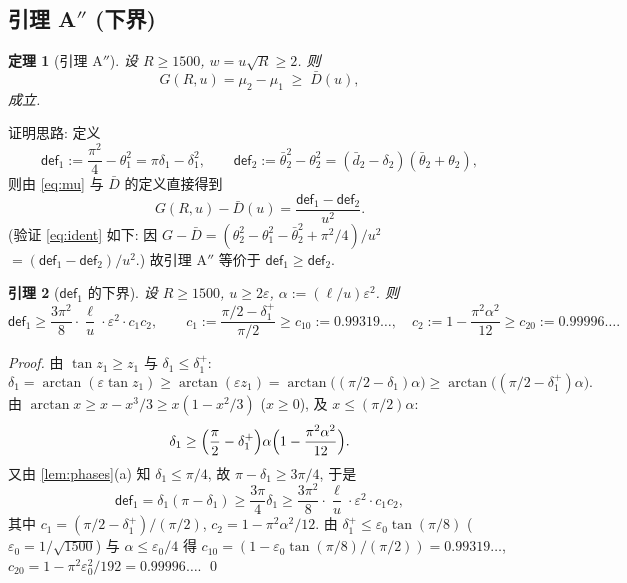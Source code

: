 \documentclass[UTF8]{ctexart}
\newtheorem{theorem}{定理}[section]
\newtheorem{lemma}[theorem]{引理}
\begin{document}
\subsection{引理 A\texorpdfstring{$''$}{} (下界)}\label{sec:lemAdp}
\begin{theorem}[引理 A$''$]\label{thm:lemAdp}
设 $R\ge1500$, $w=u\sqrt R\ge2$. 则
\begin{equation}
	G(R,u)=\mu_2-\mu_1\;\ge\;\bar D(u),
\end{equation}
成立.
\end{theorem}

证明思路: 定义
\begin{equation}
	\mathsf{def}_1:=\frac{\pi^2}{4}-\theta_1^2=\pi\delta_1-\delta_1^2,\qquad
	\mathsf{def}_2:=\bar\theta_2^2-\theta_2^2=(\bar d_2-\delta_2)(\bar\theta_2+\theta_2),
\end{equation}
则由 \eqref{eq:mu} 与 $\bar D$ 的定义直接得到
\begin{equation}
	G(R,u)-\bar D(u)=\frac{\mathsf{def}_1-\mathsf{def}_2}{u^2}.
	\label{eq:ident}
\end{equation}
(验证 \eqref{eq:ident} 如下: 因 $G-\bar D=(\theta_2^2-\theta_1^2-\bar\theta_2^2+\pi^2/4)/u^2$
$=(\mathsf{def}_1-\mathsf{def}_2)/u^2$.) 故引理 A$''$ 等价于 $\mathsf{def}_1\ge\mathsf{def}_2$.

\begin{lemma}[$\mathsf{def}_1$ 的下界]\label{lem:def1}
设 $R\ge1500$, $u\ge2\varepsilon$, $\alpha:=(\ell/u)\varepsilon^2$. 则
\begin{equation}
	\mathsf{def}_1\ge\frac{3\pi^2}{8}\cdot\frac{\ell}{u}\cdot\varepsilon^2\cdot c_1c_2,
	\qquad
	c_1:=\frac{\pi/2-\delta_1^+}{\pi/2}\ge c_{10}:=0.99319\ldots,\quad
	c_2:=1-\frac{\pi^2\alpha^2}{12}\ge c_{20}:=0.99996\ldots .
\end{equation}
\end{lemma}
\begin{proof}
由 $\tan z_1\ge z_1$ 与 $\delta_1\le\delta_1^+$:
\begin{equation}
	\delta_1=\arctan(\varepsilon\tan z_1)\ge\arctan(\varepsilon z_1)
	=\arctan\bigl((\pi/2-\delta_1)\alpha\bigr)
	\ge\arctan\bigl((\pi/2-\delta_1^+)\alpha\bigr).
\end{equation}
由 $\arctan x\ge x-x^3/3\ge x(1-x^2/3)$ ($x\ge0$), 及 $x\le(\pi/2)\alpha$:
\begin{equation}
	\delta_1\ge\Bigl(\frac\pi2-\delta_1^+\Bigr)\alpha\Bigl(1-\frac{\pi^2\alpha^2}{12}\Bigr).
\end{equation}
又由 \ref{lem:phases}(a) 知 $\delta_1\le\pi/4$, 故 $\pi-\delta_1\ge3\pi/4$, 于是
\begin{equation}
	\mathsf{def}_1=\delta_1(\pi-\delta_1)\ge\frac{3\pi}{4}\delta_1
	\ge\frac{3\pi^2}{8}\cdot\frac{\ell}{u}\cdot\varepsilon^2\cdot c_1c_2,
\end{equation}
其中 $c_1=(\pi/2-\delta_1^+)/(\pi/2)$, $c_2=1-\pi^2\alpha^2/12$.
由 $\delta_1^+\le\varepsilon_0\tan(\pi/8)$ ($\varepsilon_0=1/\sqrt{1500}$) 与 $\alpha\le\varepsilon_0/4$
得 $c_{10}=(1-\varepsilon_0\tan(\pi/8)/(\pi/2))=0.99319\ldots$,
$c_{20}=1-\pi^2\varepsilon_0^2/192=0.99996\ldots$. \qed
\end{proof}
\end{document}
